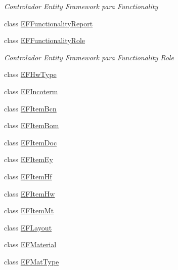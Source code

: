 \begin{DoxyCompactItemize}
\begin{DoxyCompactList}\small\item\em Controlador Entity Framework para Functionality \end{DoxyCompactList}\item 
class \mbox{\hyperlink{class_h_k_supply_1_1_services_1_1_implementations_1_1_e_f_functionality_report}{E\+F\+Functionality\+Report}}
\item 
class \mbox{\hyperlink{class_h_k_supply_1_1_services_1_1_implementations_1_1_e_f_functionality_role}{E\+F\+Functionality\+Role}}
\begin{DoxyCompactList}\small\item\em Controlador Entity Framework para Functionality Role \end{DoxyCompactList}\item 
class \mbox{\hyperlink{class_h_k_supply_1_1_services_1_1_implementations_1_1_e_f_hw_type}{E\+F\+Hw\+Type}}
\item 
class \mbox{\hyperlink{class_h_k_supply_1_1_services_1_1_implementations_1_1_e_f_incoterm}{E\+F\+Incoterm}}
\item 
class \mbox{\hyperlink{class_h_k_supply_1_1_services_1_1_implementations_1_1_e_f_item_bcn}{E\+F\+Item\+Bcn}}
\item 
class \mbox{\hyperlink{class_h_k_supply_1_1_services_1_1_implementations_1_1_e_f_item_bom}{E\+F\+Item\+Bom}}
\item 
class \mbox{\hyperlink{class_h_k_supply_1_1_services_1_1_implementations_1_1_e_f_item_doc}{E\+F\+Item\+Doc}}
\item 
class \mbox{\hyperlink{class_h_k_supply_1_1_services_1_1_implementations_1_1_e_f_item_ey}{E\+F\+Item\+Ey}}
\item 
class \mbox{\hyperlink{class_h_k_supply_1_1_services_1_1_implementations_1_1_e_f_item_hf}{E\+F\+Item\+Hf}}
\item 
class \mbox{\hyperlink{class_h_k_supply_1_1_services_1_1_implementations_1_1_e_f_item_hw}{E\+F\+Item\+Hw}}
\item 
class \mbox{\hyperlink{class_h_k_supply_1_1_services_1_1_implementations_1_1_e_f_item_mt}{E\+F\+Item\+Mt}}
\item 
class \mbox{\hyperlink{class_h_k_supply_1_1_services_1_1_implementations_1_1_e_f_layout}{E\+F\+Layout}}
\item 
class \mbox{\hyperlink{class_h_k_supply_1_1_services_1_1_implementations_1_1_e_f_material}{E\+F\+Material}}
\item 
class \mbox{\hyperlink{class_h_k_supply_1_1_services_1_1_implementations_1_1_e_f_mat_type}{E\+F\+Mat\+Type}}

\end{DoxyCompactItemize}
